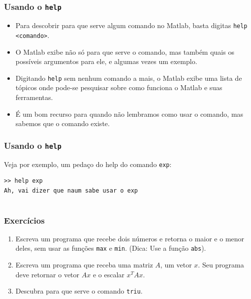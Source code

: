 \documentclass{beamer}
\begin{document}
\subsection[Usando o Help]{}

\begin{frame}
\frametitle{Usando o {\tt help}}

\begin{itemize}
\item<1-> Para descobrir para que serve algum comando no Matlab, basta digitas {\tt help <comando>}.
\item<2-> O Matlab exibe n\~ao s\'o para que serve o comando, mas tamb\'em quais os poss\'iveis argumentos para ele, e algumas vezes um exemplo.
\item<3-> Digitando {\tt help} sem nenhum comando a mais, o Matlab exibe uma lista de t\'opicos onde pode-se pesquisar sobre como funciona o Matlab e suas ferramentas.
\item<4-> \'E um bom recurso para quando n\~ao lembramos como usar o comando, mas sabemos que o comando existe.
\end{itemize}

\end{frame}

\begin{frame}[fragile]
\frametitle{Usando o {\tt help}}

Veja por exemplo, um peda\c{c}o do help do comando {\tt exp}:
\pause

\begin{verbatim}
>> help exp
Ah, vai dizer que naum sabe usar o exp
\end{verbatim}

\end{frame}


\section[Exerc\'icios]{}

\begin{frame}
\frametitle{Exerc\'icios}

\begin{enumerate}
\item Escreva um programa que recebe dois n\'umeros e retorna o maior e o menor deles, sem usar as fun\c{c}\~oes {\tt max} e {\tt min}. (Dica: Use a fun\c{c}\~ao {\tt abs}).
\item Escreva um programa que receba uma matriz $A$, um vetor $x$. Seu programa deve retornar o vetor $Ax$ e o escalar $x^TAx$.
\item Descubra para que serve o comando {\tt triu}.
\end{enumerate}

\end{frame}
\end{document}
